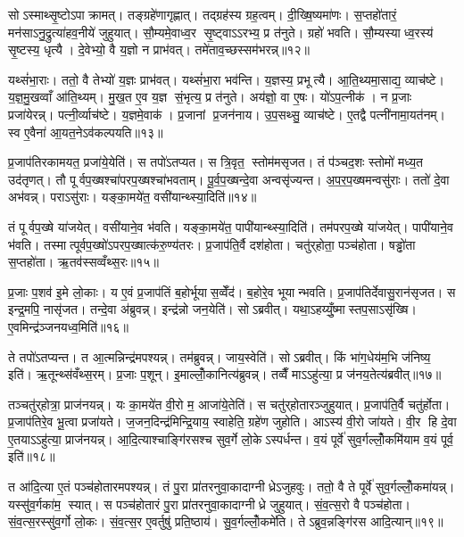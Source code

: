 सोऽस्माथ्सृ॒ष्टोऽपाक्रामत्। तङ्ग्रहे॑णागृह्णात्। तद्ग्रह॑स्य ग्रह॒त्वम्। दी॒ख्षि॒ष्यमा॑णः। स॒प्तहो॑तारं॒ मन॑साऽनु॒द्रुत्या॑हव॒नीये॑ जुहुयात्। सौ॒म्यमे॒वाध्व॒र सृ॒ष्ट्वाऽऽरभ्य॒ प्र त॑नुते। ग्रहो॑ भवति। सौ॒म्यस्याध्व॒रस्य॑ सृ॒ष्टस्य॒ धृत्यै। दे॒वेभ्यो॒ वै य॒ज्ञो न प्राभ॑वत्। तमे॑ताव॒च्छस्सम॑भरन्न्॥१२॥

यथ्सं॑भा॒राः। ततो॒ वै तेभ्यो॑ य॒ज्ञः प्राभ॑वत्। यथ्सं॑भा॒रा भव॑न्ति। य॒ज्ञस्य॒ प्रभूत्यै। आ॒ति॒थ्यमा॒साद्य॒ व्याच॑ष्टे। य॒ज्ञ॒मु॒खव्वाँ आ॑ति॒थ्यम्। मु॒ख॒त ए॒व य॒ज्ञ सं॒भृत्य॒ प्र त॑नुते। अय॑ज्ञो॒ वा ए॒षः। यो॑ऽप॒त्नीक॑। न प्र॒जाः प्रजा॑येरन्न्। पत्नी॒र्व्याच॑ष्टे। य॒ज्ञमे॒वाक॑। प्र॒जानां प्र॒जन॑नाय। उ॒प॒सथ्सु॒ व्याच॑ष्टे। ए॒तद्वै पत्नी॑नामा॒यत॑नम्। स्व ए॒वैना॑ आ॒यत॒नेऽव॑कल्पयति॥१३॥\anuvakamend[त॒नु॒त॒ आ॒लभ॑मानोऽगृह्णादसृजताभरञ्जायेर॒न्थ्षट्च॑]

प्र॒जाप॑तिरकामयत॒ प्रजा॑ये॒येति॑। स तपो॑ऽतप्यत। स त्रि॒वृत॒ स्तोम॑मसृजत। तं प॑ञ्चद॒शः स्तोमो॑ मध्य॒त उद॑तृणत्। तौ पूर्वप॒ख्षश्चा॑परप॒ख्षश्चा॑भवताम्। पू॒र्व॒प॒ख्षन्दे॒वा अन्वसृ॑ज्यन्त। अ॒प॒र॒प॒ख्षमन्वसु॑राः। ततो॑ दे॒वा अभ॑वन्न्। पराऽसु॑राः। यङ्का॒मये॑त॒ वसी॑यान्थ्स्या॒दिति॑॥१४॥

तं पूर्वप॒ख्षे या॑जयेत्। वसी॑याने॒व भ॑वति। यङ्का॒मये॑त॒ पापी॑यान्थ्स्या॒दिति॑। तम॑परप॒ख्षे या॑जयेत्। पापी॑याने॒व भ॑वति। तस्मात्पूर्वप॒ख्षो॑ऽपरप॒ख्षात्क॑रु॒ण्य॑तरः। प्र॒जाप॑ति॒र्वै दश॑होता। चतु॑र्‌होता॒ पञ्च॑होता। षड्ढो॑ता स॒प्तहो॑ता। ऋ॒तव॑स्सव्वँथ्स॒रः॥१५॥

प्र॒जाः प॒शव॑ इ॒मे लो॒काः। य ए॒वं प्र॒जाप॑तिं ब॒होर्भूयास॒व्वेँद॑। ब॒होरे॒व भूयान्भवति। प्र॒जाप॑तिर्देवासु॒रान॑सृजत। स इन्द्र॒मपि॒ नासृ॑जत। तन्दे॒वा अ॑ब्रुवन्न्। इन्द्र॑न्नो जन॒येति॑। सोऽब्रवीत्। यथा॒ऽहय्युँ॒ष्मास्तप॒साऽसृ॑ख्षि। ए॒वमिन्द्र॑ञ्जनयध्व॒मिति॑॥१६॥

ते तपो॑ऽतप्यन्त। त आ॒त्मन्निन्द्र॑मपश्यन्न्। तम॑ब्रुवन्न्। जाय॒स्वेति॑। सोऽब्रवीत्। किं भा॑ग॒धेय॑म॒भि ज॑निष्य॒ इति॑। ऋ॒तून्थ्स॑वँथ्स॒रम्। प्र॒जाः प॒शून्। इ॒माल्लोँ॒कानित्य॑ब्रुवन्न्। तव्वैँ माऽऽहु॑त्या॒ प्र ज॑नय॒तेत्य॑ब्रवीत्॥१७॥

तञ्चतु॑र्‌होत्रा॒ प्राज॑नयन्न्। यः का॒मये॑त वी॒रो म॒ आजा॑ये॒तेति॑। स चतु॑र्‌होतारञ्जुहुयात्। प्र॒जाप॑ति॒र्वै चतु॑र्होता। प्र॒जाप॑तिरे॒व भू॒त्वा प्रजा॑यते। ज॒जन॒दिन्द्र॑मिन्द्रि॒याय॒ स्वाहेति॒ ग्रहे॑ण जुहोति। आऽस्य॑ वी॒रो जा॑यते। वी॒र हि दे॒वा ए॒तयाऽऽहु॑त्या॒ प्राज॑नयन्न्। आ॒दि॒त्याश्चाङ्गि॑रसश्च सुव॒र्गे लो॒केऽस्पर्धन्त। व॒यं पूर्वे॑ सुव॒र्गल्लोँ॒कमि॑याम व॒यं पूर्व॒ इति॑॥१८॥

त आ॑दि॒त्या ए॒तं पञ्च॑होतारमपश्यन्न्। तं पु॒रा प्रा॑तरनुवा॒कादाग्नीध्रेऽजुहवुः। ततो॒ वै ते पूर्वे॑ सुव॒र्गल्लोँ॒कमा॑यन्न्। यस्सु॑व॒र्गका॑म॒ स्यात्। स पञ्च॑होतारं पु॒रा प्रा॑तरनुवा॒कादाग्नीध्रे जुहुयात्। सं॒व॒त्स॒रो वै पञ्च॑होता। सं॒व॒त्स॒रस्सु॑व॒र्गो लो॒कः। सं॒व॒त्स॒र ए॒वर्तुषु॑ प्रति॒ष्ठाय॑। सु॒व॒र्गल्लोँ॒कमे॑ति। तेऽब्रुव॒न्नङ्गि॑रस आदि॒त्यान्॥१९॥

